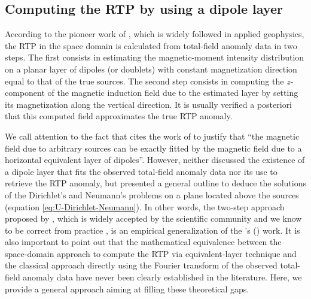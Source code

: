 \subsection{Computing the RTP by using a dipole layer}


According to the pioneer work of \citet{silva1986}, which is widely followed in applied geophysics, 
the RTP in the space domain is calculated from total-field anomaly data in two steps.
The first consists in estimating the magnetic-moment intensity distribution on a planar layer 
of dipoles (or doublets) with constant magnetization direction equal to that of the true sources.
The second step consists in computing the $z$-component of the magnetic induction field due 
to the estimated layer by setting its magnetization along the vertical direction.
It is usually verified a posteriori that this computed field approximates the true RTP anomaly.

We call attention to the fact that \citet{silva1986} cites the work of \citet{roy1962} to justify that ``the magnetic 
field due to arbitrary sources can be exactly fitted by the magnetic field due to a horizontal equivalent
layer of dipoles''. 
However, \citeauthor{roy1962} neither discussed the existence of a dipole layer that fits the observed total-field 
anomaly data nor its use to retrieve the RTP anomaly, but 
presented a general outline to deduce the solutions of the Dirichlet's and Neumann's problems on a plane 
located above the sources (equation \ref{eq:U-Dirichlet-Neumann}).
In other words, the two-step approach proposed by \citet{silva1986}, which is widely accepted by the scientific community 
and we know to be correct from practice 
\citep[e.g., ][]{leao-silva_1989, guspi_novara2009, oliveirajr_etal2013, li_etal2014, reis_etal2020, takahashi-etal2022}, 
is an empirical generalization of the \citeauthor{roy1962}'s (\citeyear{roy1962}) work. 
It is also important to point out that the mathematical equivalence between the space-domain approach to compute the 
RTP via equivalent-layer technique and the classical approach directly using the Fourier transform of the observed 
total-field anomaly data \citep[e.g., ][ p. 331]{blakely1996} have never been clearly established in the literature.
Here, we provide a general approach aiming at filling these theoretical gaps.

